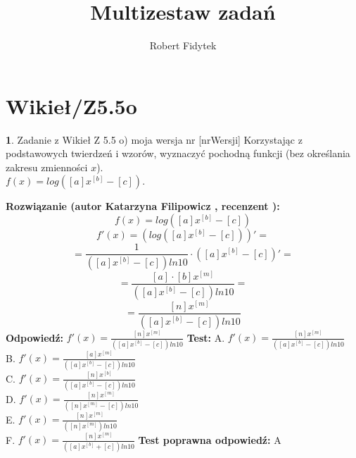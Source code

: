 \documentclass[12pt, a4paper]{article}
\title{Multizestaw zadań}
\author{Robert Fidytek}
\date{}
\theoremstyle{definition} %
\newtheorem{zad}{}
\newcommand{\kategoria}[1]{\section{#1}} %
\newcommand{\zadStart}[1]{\begin{zad}#1\newline} %
\newcommand{\zadStop}{\end{zad}}   %
\newcommand{\rozwStart}[2]{\noindent \textbf{Rozwiązanie (autor #1 , recenzent #2): }\newline} %
\newcommand{\rozwStop}{\newline}                                            %
\newcommand{\odpStart}{\noindent \textbf{Odpowiedź:}\newline}    %
\newcommand{\odpStop}{\newline}                                             %
\newcommand{\testStart}{\noindent \textbf{Test:}\newline} %
\newcommand{\testStop}{\newline} %
\newcommand{\kluczStart}{\noindent \textbf{Test poprawna odpowiedź:}\newline} %
\newcommand{\kluczStop}{\newline} %
\begin{document}
\maketitle


\kategoria{Wikieł/Z5.5o}
\zadStart{Zadanie z Wikieł Z 5.5 o) moja wersja nr [nrWersji]}
Korzystając z podstawowych twierdzeń i wzorów, wyznaczyć pochodną funkcji (bez określania zakresu zmienności $x$).\\ $f(x)=log([a]x^{[b]}-[c])$.
\zadStop
\rozwStart{Katarzyna Filipowicz}{}
$$f(x)=log([a]x^{[b]}-[c])$$
$$f'(x)=\left(log([a]x^{[b]}-[c])\right)' = $$
$$ = \frac{1}{([a]x^{[b]}-[c])ln10}\cdot ([a]x^{[b]}-[c] )'= $$
$$
= \frac{[a]\cdot [b]x^{[m]}}{([a]x^{[b]}-[c])ln10}=
$$ $$
=\frac{[n]x^{[m]}}{([a]x^{[b]}-[c])ln10}
$$
\rozwStop
\odpStart
$ f'(x)=\frac{[n]x^{[m]}}{([a]x^{[b]}-[c])ln10}$
\odpStop
\testStart
A. $ f'(x)=\frac{[n]x^{[m]}}{([a]x^{[b]}-[c])ln10}$\\
B. $ f'(x)=\frac{[a]x^{[m]}}{([a]x^{[b]}-[c])ln10}$\\
C. $ f'(x)=\frac{[n]x^{[b]}}{([a]x^{[b]}-[c])ln10}$ \\
D. $ f'(x)=\frac{[n]x^{[m]}}{([n]x^{[m]}-[c])ln10}$\\
E. $ f'(x)=\frac{[n]x^{[m]}}{([n]x^{[m]})ln10}$\\
F. $ f'(x)=\frac{[n]x^{[m]}}{([a]x^{[b]}+[c])ln10}$
\testStop
\kluczStart
A
\kluczStop
\end{document}
